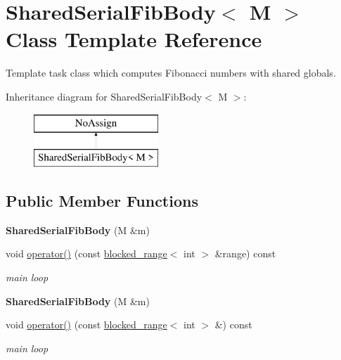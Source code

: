 \hypertarget{classSharedSerialFibBody}{}\section{Shared\+Serial\+Fib\+Body$<$ M $>$ Class Template Reference}
\label{classSharedSerialFibBody}


Template task class which computes Fibonacci numbers with shared globals.  


Inheritance diagram for Shared\+Serial\+Fib\+Body$<$ M $>$\+:\begin{figure}[H]
\begin{center}
\leavevmode
\includegraphics[height=2.000000cm]{classSharedSerialFibBody}
\end{center}
\end{figure}
\subsection*{Public Member Functions}
\begin{DoxyCompactItemize}
\item 
\hypertarget{classSharedSerialFibBody_a1bb9f28a87519a74be043925f8aa8bdd}{}{\bfseries Shared\+Serial\+Fib\+Body} (M \&m)\label{classSharedSerialFibBody_a1bb9f28a87519a74be043925f8aa8bdd}

\item 
\hypertarget{classSharedSerialFibBody_a1b40eec70f0c0f0b47181f138cfdc145}{}void \hyperlink{classSharedSerialFibBody_a1b40eec70f0c0f0b47181f138cfdc145}{operator()} (const \hyperlink{classtbb_1_1blocked__range}{blocked\+\_\+range}$<$ int $>$ \&range) const \label{classSharedSerialFibBody_a1b40eec70f0c0f0b47181f138cfdc145}

\begin{DoxyCompactList}\small\item\em main loop \end{DoxyCompactList}\item 
\hypertarget{classSharedSerialFibBody_a1bb9f28a87519a74be043925f8aa8bdd}{}{\bfseries Shared\+Serial\+Fib\+Body} (M \&m)\label{classSharedSerialFibBody_a1bb9f28a87519a74be043925f8aa8bdd}

\item 
\hypertarget{classSharedSerialFibBody_ab8e63210df8db1f27975fbaf40106e9e}{}void \hyperlink{classSharedSerialFibBody_ab8e63210df8db1f27975fbaf40106e9e}{operator()} (const \hyperlink{classtbb_1_1blocked__range}{blocked\+\_\+range}$<$ int $>$ \&) const \label{classSharedSerialFibBody_ab8e63210df8db1f27975fbaf40106e9e}

\begin{DoxyCompactList}\small\item\em main loop \end{DoxyCompactList}\end{DoxyCompactItemize}


